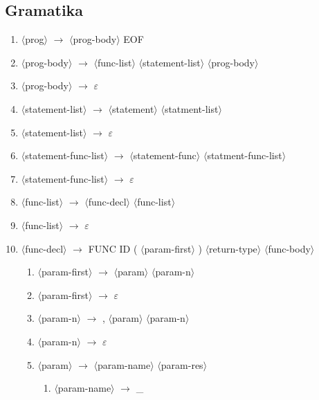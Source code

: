\documentclass[11spt]{article}
\newcommand{\red}[1]{{\color{red} #1}}
\begin{document}
\subsection{Gramatika}
\begin{enumerate}
    \item $\langle$prog$\rangle$ $\rightarrow$ $\langle$prog-body$\rangle$ \red{EOF}
    \item $\langle$prog-body$\rangle$ $\rightarrow$ $\langle$func-list$\rangle$ $\langle$statement-list$\rangle$ $\langle$prog-body$\rangle$
    \item $\langle$prog-body$\rangle$ $\rightarrow$ \red{\red{$\varepsilon$}}
    \item $\langle$statement-list$\rangle$ $\rightarrow$ $\langle$statement$\rangle$ $\langle$statment-list$\rangle$
    \item $\langle$statement-list$\rangle$ $\rightarrow$ \red{$\varepsilon$}
    \item $\langle$statement-func-list$\rangle$ $\rightarrow$ $\langle$statement-func$\rangle$ $\langle$statment-func-list$\rangle$
    \item $\langle$statement-func-list$\rangle$ $\rightarrow$ \red{$\varepsilon$}
    \item $\langle$func-list$\rangle$ $\rightarrow$ $\langle$func-decl$\rangle$ $\langle$func-list$\rangle$
    \item $\langle$func-list$\rangle$ $\rightarrow$ \red{$\varepsilon$}
    \item  $\langle$func-decl$\rangle$ $\rightarrow$ \red{FUNC ID (} $\langle$param-first$\rangle$ \red{)} $\langle$return-type$\rangle$ $\langle$func-body$\rangle$
    \begin{enumerate}
        \item $\langle$param-first$\rangle$ $\rightarrow$ $\langle$param$\rangle$ $\langle$param-n$\rangle$
        \item $\langle$param-first$\rangle$ $\rightarrow$ \red{$\varepsilon$}
        \item $\langle$param-n$\rangle$ $\rightarrow$ \red{,} $\langle$param$\rangle$ $\langle$param-n$\rangle$
        \item $\langle$param-n$\rangle$ $\rightarrow$ \red{$\varepsilon$}
        \item $\langle$param$\rangle$ $\rightarrow$ $\langle$param-name$\rangle$ $\langle$param-res$\rangle$ 
        \begin{enumerate}
            \item $\langle$param-name$\rangle$ $\rightarrow$ \red{\_}

\end{enumerate}
\end{enumerate}
\end{enumerate}
\end{document}
